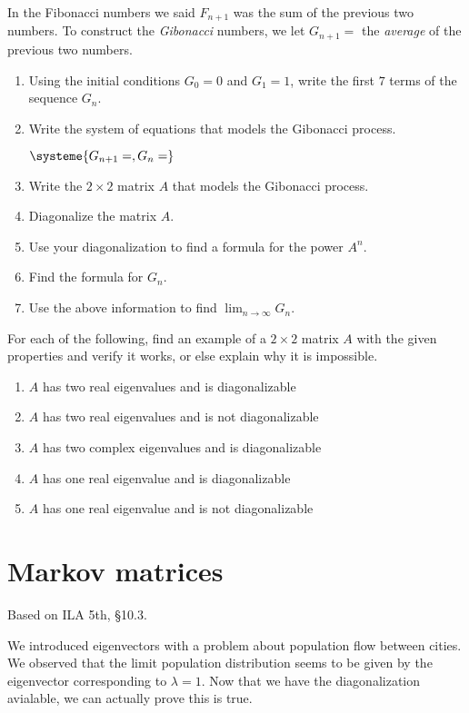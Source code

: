 \documentclass[11pt,oneside]{amsbook}
\theoremstyle{definition}
\theoremstyle{plain}
\theoremstyle{definition}
\theoremstyle{remark}
\numberwithin{equation}{section}
\numberwithin{figure}{section}
\newcounter{activityitem}
\newenvironment{activity}{\begin{list}{\arabic{activityitem}.}{\usecounter{activityitem}\setlength{\itemsep}{.2in}}}{\end{list}}
\begin{document}
\begin{activity}
  \item In the Fibonacci numbers we said $F_{n+1}$ was the sum of the previous two numbers. To construct the \emph{Gibonacci} numbers, we let $G_{n+1}=$ the \emph{average} of the previous two numbers.
  \begin{enumerate}
    \item Using the initial conditions $G_0=0$ and $G_1=1$, write the first $7$ terms of the sequence $G_n$.
    \item Write the system of equations that models the Gibonacci process.
    
      $\systeme{G_{n+1}=,G_n=}$
    \item Write the $2\times2$ matrix $A$ that models the Gibonacci process.
    \item Diagonalize the matrix $A$.
    \item Use your diagonalization to find a formula for the power $A^n$.
    \item Find the formula for $G_n$.
    \item Use the above information to find $\lim_{n\to\infty}G_n$.
  \end{enumerate}
  \item For each of the following, find an example of a $2\times 2$ matrix $A$ with the given properties and verify it works, or else explain why it is impossible.
  \begin{enumerate}
    \item $A$ has two real eigenvalues and is diagonalizable
    \item $A$ has two real eigenvalues and is not diagonalizable
    \item $A$ has two complex eigenvalues and is diagonalizable
    \item $A$ has one real eigenvalue and is diagonalizable
    \item $A$ has one real eigenvalue and is not diagonalizable
  \end{enumerate}
\end{activity}


\newpage
\section{Markov matrices}

Based on ILA 5th, \S 10.3.

We introduced eigenvectors with a problem about population flow between cities. We observed that the limit population distribution seems to be given by the eigenvector corresponding to $\lambda=1$. Now that we have the diagonalization avialable, we can actually prove this is true.
\end{document}
